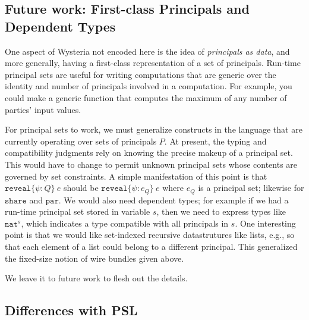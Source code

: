 \documentclass[10pt]{article}
\newcommand{\kw}[1]{\ensuremath{\mathtt{#1}}}
\newcommand{\tnat}{\ensuremath{\mathtt{nat}}}
\newcommand{\ereveal}[3]{\ensuremath{\kw{reveal}\{{#1}\!:\!{#2}\}~{#3}}}
\begin{document}

\subsection{Future work: First-class Principals and Dependent Types}
\label{sec:deptypes}

One aspect of Wysteria not encoded here is the idea of
\emph{principals as data}, and more generally, having a first-class
representation of a set of principals. Run-time principal sets are
useful for writing computations that are generic over the identity and
number of principals involved in a computation. For example, you could
make a generic function that computes the maximum of any number of
parties' input values.

For principal sets to work, we must generalize constructs in the
language that are currently operating over sets of principals $P$. At
present, the typing and compatibility judgments rely on knowing the
precise makeup of a principal set. This would have to change to permit
unknown principal sets whose contents are governed by set
constraints. A simple manifestation of this point is that
$\ereveal{\psi}{Q}{e}$ should be $\ereveal{\psi}{e_Q}{e}$
where $e_Q$ is a principal set; likewise for $\kw{share}$
and $\kw{par}$. We would also need dependent types; for example if we
had a run-time principal set stored in variable $s$, then we need to
express types like $\tnat^s$, which indicates a type compatible with
all principals in $s$. One interesting point is that we would like
set-indexed recursive datastrutures like lists, e.g., so that each
element of a list could belong to a different principal. This
generalized the fixed-size notion of wire bundles given above.

We leave it to future work to flesh out the details. 

\subsection{Differences with PSL}
\end{document}
